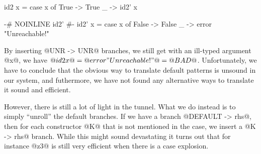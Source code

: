 \begin{code}
    id2 x = case x of
        True -> True
        _    -> id2' x

    {-# NOINLINE id2' #-}
    id2' x = case x of
        False -> False
        _     -> error "Unreachable!"
\end{code}

By inserting @UNR -> UNR@ branches, we still get with an ill-typed
argument @x@, we have $@id2 x@ = @error "Unreachable!"@ = @BAD@$.
Unfortunately, we have to conclude that the obvious way to translate
default patterns is unsound in our system, and futhermore, we have not
found any alternative ways to translate it sound and efficient.

However, there is still a lot of light in the tunnel. What we do
instead is to simply ``unroll'' the default branches.  If we have a
branch @DEFAULT -> rhs@, then for each constructor @K@ that is not
mentioned in the case, we insert a @K -> rhs@ branch. While this might
sound devastating it turns out that for instance @z3@ is still very
efficient when there is a case explosion.






